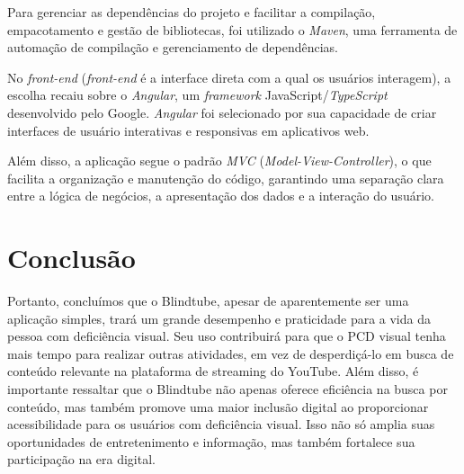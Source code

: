 \documentclass[12pt]{article}
\begin{document}
Para gerenciar as dependências do projeto e facilitar a compilação, empacotamento e gestão de bibliotecas, foi utilizado o \textit{Maven}, uma ferramenta de automação de compilação e gerenciamento de dependências.

No \textit{front-end} (\textit{front-end} é a interface direta com a qual os usuários interagem), a escolha recaiu sobre o \textit{Angular}, um \textit{framework} JavaScript/\textit{TypeScript} desenvolvido pelo Google. \textit{Angular} foi selecionado por sua capacidade de criar interfaces de usuário interativas e responsivas em aplicativos web.

Além disso, a aplicação segue o padrão \textit{MVC} (\textit{Model-View-Controller}), o que facilita a organização e manutenção do código, garantindo uma separação clara entre a lógica de negócios, a apresentação dos dados e a interação do usuário.

\section{Conclusão}

Portanto, concluímos que o Blindtube, apesar de aparentemente ser uma aplicação simples, trará um grande desempenho e praticidade para a vida da pessoa com deficiência visual. Seu uso contribuirá para que o PCD visual tenha mais tempo para realizar outras atividades, em vez de desperdiçá-lo em busca de conteúdo relevante na plataforma de streaming do YouTube.
Além disso, é importante ressaltar que o Blindtube não apenas oferece eficiência na busca por conteúdo, mas também promove uma maior inclusão digital ao proporcionar acessibilidade para os usuários com deficiência visual. Isso não só amplia suas oportunidades de entretenimento e informação, mas também fortalece sua participação na era digital.


 
\end{document}
